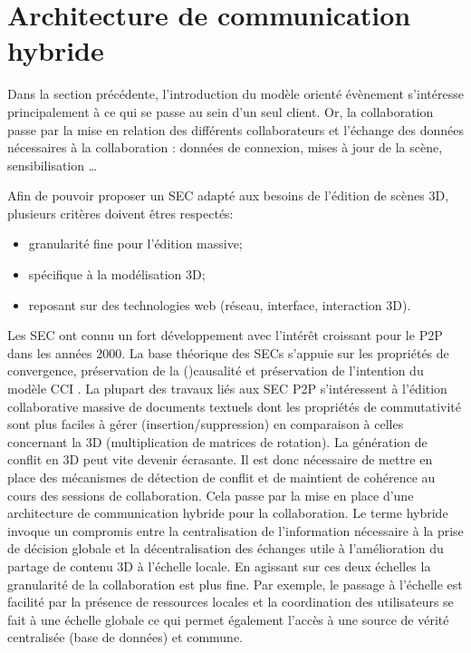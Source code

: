 \section{Architecture de communication hybride}


Dans la section précédente, l'introduction du modèle orienté évènement s'intéresse 
principalement à ce qui se passe au sein d'un seul client. Or, la collaboration 
passe par la mise en relation des différents collaborateurs et l'échange des 
données nécessaires à la collaboration : données de connexion, mises à jour de la 
scène, sensibilisation \dots 

Afin de pouvoir proposer un \gls{SEC} adapté aux besoins de l'édition de scènes 
3D, plusieurs critères doivent êtres respectés: 
\begin{itemize}
	\item granularité fine pour l'édition massive;
	\item spécifique à la modélisation 3D;
	\item reposant sur des technologies web (réseau, interface, interaction 3D).
\end{itemize}

Les \gls{SEC} ont connu un fort développement avec l'intérêt croissant 
pour le \gls{P2P} dans les années 2000. 
La base théorique des \glspl{SEC} s'appuie sur les propriétés de 
convergence, préservation de la 
()causalité et préservation de l'intention du modèle \acrshort{CCI} 
\cite{Sun1998}. 
La plupart des travaux liés aux \gls{SEC} \gls{P2P} s'intéressent à 
l'édition collaborative massive de documents textuels dont les propriétés 
de commutativité sont plus faciles à gérer (insertion/suppression) en 
comparaison à celles concernant la 3D (multiplication de matrices de 
rotation). La génération de conflit en 3D peut vite devenir écrasante. Il est 
donc nécessaire de mettre en place des mécanismes de détection de 
conflit et de maintient de cohérence au cours des sessions de 
collaboration. 
Cela passe par la mise en place d'une architecture de communication 
hybride pour la collaboration. 
Le terme \og hybride\fg{} invoque un compromis entre la 
centralisation de l'information nécessaire à la prise de décision globale et 
la décentralisation des échanges utile à l'amélioration du partage de 
contenu 3D à l'échelle locale. 
En agissant sur ces deux échelles la granularité de la collaboration est plus fine. 
Par exemple, le passage à l'échelle est facilité par la présence de 
ressources locales et la coordination des utilisateurs se fait à une échelle 
globale ce qui permet également l'accès à une source de vérité 
centralisée (base de données) et commune.

